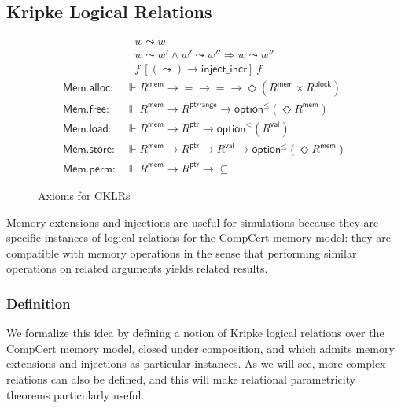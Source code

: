 \documentclass[acmsmall,timestamp,review]{acmart}
\newcommand{\kw}[1]{\ensuremath{ \mathsf{#1} }}
\newcommand{\ifr}[1]{\ [{#1}]\ }
\begin{document}


\subsection{Kripke Logical Relations} %

\begin{figure} %
  \begin{gather*}
    w \leadsto w \\
    w \leadsto w' \wedge w' \leadsto w'' \Rightarrow w \leadsto w'' \\
    f \ifr{(\leadsto) \rightarrow \kw{inject\_incr}} f
  \end{gather*}
  \begin{align*}
      \kw{Mem.alloc} :
        &\Vdash R^\kw{mem} \rightarrow {=} \rightarrow {=} \rightarrow
        \Diamond (R^\kw{mem} \times R^\kw{block})
      \\
      \kw{Mem.free} :
        &\Vdash R^\kw{mem} \rightarrow R^\kw{ptrrange} \rightarrow
        \kw{option}^\le(\Diamond R^\kw{mem})
      \\
      \kw{Mem.load} :
        &\Vdash R^\kw{mem} \rightarrow R^\kw{ptr} \rightarrow
        \kw{option}^\le(R^\kw{val})
      \\
      \kw{Mem.store} :
        &\Vdash R^\kw{mem} \rightarrow R^\kw{ptr} \rightarrow R^\kw{val} \rightarrow
        \kw{option}^\le(\Diamond R^\kw{mem})
      \\
      \kw{Mem.perm} :
        &\Vdash R^\kw{mem} \rightarrow R^\kw{ptr} \rightarrow {\subseteq}
  \end{align*}
  \caption{Axioms for CKLRs}
  \label{fig:cklr-def}
\end{figure}

Memory extensions and injections
are useful for simulations
because they are specific instances
of logical relations for the CompCert memory model:
they are compatible with memory operations
in the sense that
performing similar operations on related arguments
yields related results.

\subsubsection{Definition}

We formalize this idea by defining
a notion of Kripke logical relations over the CompCert memory model,
closed under composition, and which
admits memory extensions and injections as particular instances.
As we will see,
more complex relations can also be defined,
and this will make relational parametricity theorems
particularly useful.
\end{document}

